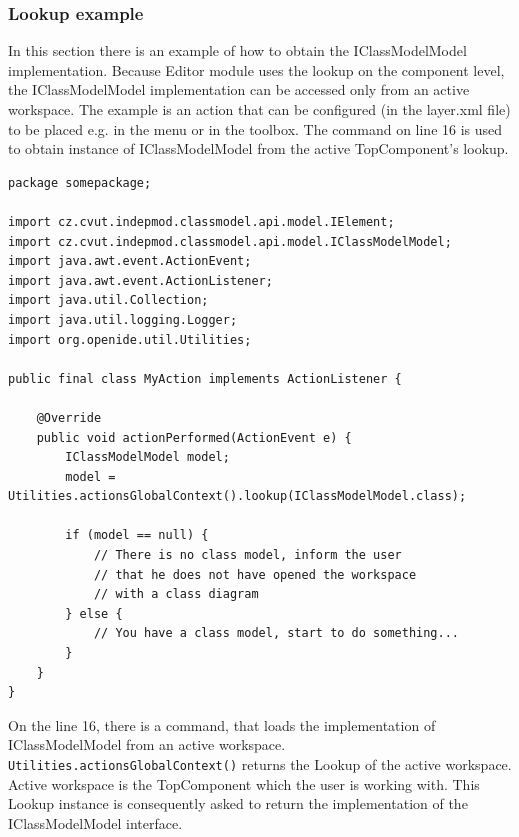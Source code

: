 \subsubsection{Lookup example}

In this section there is an example of how to obtain the IClassModelModel implementation. Because Editor module uses the lookup on the component level, the IClassModelModel implementation can be accessed only from an active workspace. The example is an action that can be configured (in the layer.xml file) to be placed e.g. in the menu or in the toolbox. The command on line 16 is used to obtain instance of IClassModelModel from the active TopComponent's lookup.

\begin{lstlisting}
package somepackage;

import cz.cvut.indepmod.classmodel.api.model.IElement;
import cz.cvut.indepmod.classmodel.api.model.IClassModelModel;
import java.awt.event.ActionEvent;
import java.awt.event.ActionListener;
import java.util.Collection;
import java.util.logging.Logger;
import org.openide.util.Utilities;

public final class MyAction implements ActionListener {

    @Override
    public void actionPerformed(ActionEvent e) {
        IClassModelModel model;
        model = Utilities.actionsGlobalContext().lookup(IClassModelModel.class);

        if (model == null) {
            // There is no class model, inform the user 
            // that he does not have opened the workspace
            // with a class diagram
        } else {
            // You have a class model, start to do something...
        }
    }
}
\end{lstlisting}

On the line 16, there is a command, that loads the implementation of IClassModelModel from an active workspace. \texttt{Utilities.actionsGlobalContext()} returns the Lookup of the active workspace. Active workspace is the TopComponent which the user is working with. This Lookup instance is consequently asked to return the implementation of the IClassModelModel interface.
